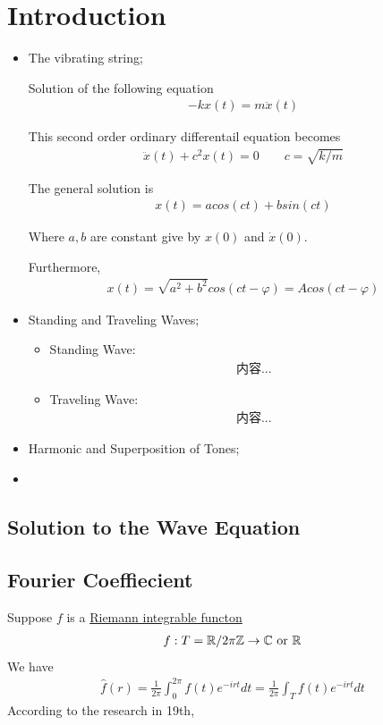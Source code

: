 \documentclass[Total.tex]{subfiles}
\begin{document}
	\chapter{Introduction}
		\begin{itemize}
			\item The vibrating string;
			
			Solution of the following equation
			\begin{gather*}
				-kx(t)=m\ddot{x}(t)
			\end{gather*}
			
			This second order ordinary differentail equation becomes
			\begin{gather*}
				\ddot{x}(t)+c^2x(t)=0\qquad c=\sqrt{k/m}
			\end{gather*}
			
			The general solution is 
			\begin{gather*}
				x(t)=acos(ct)+bsin(ct)
			\end{gather*}
			
			Where $a,b$ are constant give by $x(0)$ and $\dot{x}(0)$.
			
			Furthermore,
			\begin{gather*}
				x(t)=\sqrt{a^2+b^2}cos(ct-\varphi)=Acos(ct-\varphi)
			\end{gather*}
			\item Standing and Traveling Waves;
			\begin{itemize}
				\item Standing Wave:
				\begin{gather*}
					内容...
				\end{gather*}
				\item Traveling Wave:
				\begin{gather*}
					内容...
				\end{gather*}
			\end{itemize}
			\item Harmonic and Superposition of Tones;
			\item 
		\end{itemize}
		\section{Solution to the Wave Equation}
		\section{Fourier Coeffiecient}
			Suppose $f$ is a \underline{Riemann integrable functon}
			\begin{gather*}
				f:T=\mathbb{R}/2\pi \mathbb{Z}\rightarrow \mathbb{C}\mbox{ or }\mathbb{R}
			\end{gather*}
			We have
			\begin{gather*}
				\hat{f}(r)=\frac{1}{2\pi}\int_0^{2\pi} f(t)e^{-irt}dt=\frac{1}{2\pi}\int_T f(t)e^{-irt}dt
			\end{gather*}
			According to the research in 19th,
			
\end{document}
